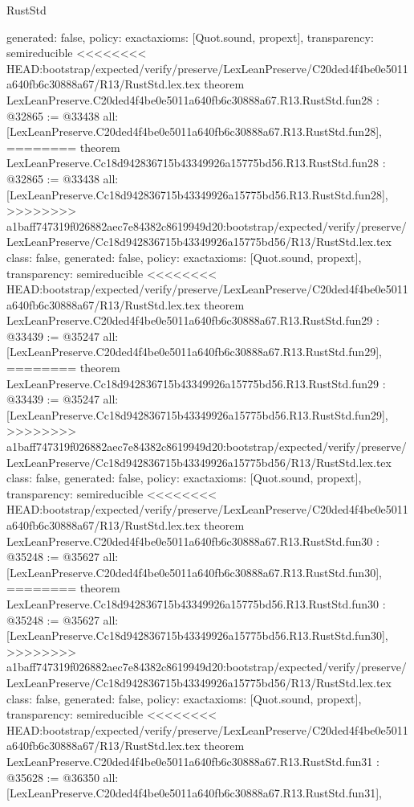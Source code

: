 \begin{lexlean}{RustStd}
\begin{coremodule}
{\begin{coremodule}
{{{{{{{{{{{{{{{{{{{{{{{{{{{{{{{  generated: false,
  policy: exact{axioms: [Quot.sound, propext]},
  transparency: semireducible
}
<<<<<<<< HEAD:bootstrap/expected/verify/preserve/LexLeanPreserve/C20ded4f4be0e5011a640fb6c30888a67/R13/RustStd.lex.tex
theorem LexLeanPreserve.C20ded4f4be0e5011a640fb6c30888a67.R13.RustStd.fun28 : @32865 := @33438 {
  all: [LexLeanPreserve.C20ded4f4be0e5011a640fb6c30888a67.R13.RustStd.fun28],
========
theorem LexLeanPreserve.Cc18d942836715b43349926a15775bd56.R13.RustStd.fun28 : @32865 := @33438 {
  all: [LexLeanPreserve.Cc18d942836715b43349926a15775bd56.R13.RustStd.fun28],
>>>>>>>> a1baff747319f026882aec7e84382c8619949d20:bootstrap/expected/verify/preserve/LexLeanPreserve/Cc18d942836715b43349926a15775bd56/R13/RustStd.lex.tex
  class: false,
  generated: false,
  policy: exact{axioms: [Quot.sound, propext]},
  transparency: semireducible
}
<<<<<<<< HEAD:bootstrap/expected/verify/preserve/LexLeanPreserve/C20ded4f4be0e5011a640fb6c30888a67/R13/RustStd.lex.tex
theorem LexLeanPreserve.C20ded4f4be0e5011a640fb6c30888a67.R13.RustStd.fun29 : @33439 := @35247 {
  all: [LexLeanPreserve.C20ded4f4be0e5011a640fb6c30888a67.R13.RustStd.fun29],
========
theorem LexLeanPreserve.Cc18d942836715b43349926a15775bd56.R13.RustStd.fun29 : @33439 := @35247 {
  all: [LexLeanPreserve.Cc18d942836715b43349926a15775bd56.R13.RustStd.fun29],
>>>>>>>> a1baff747319f026882aec7e84382c8619949d20:bootstrap/expected/verify/preserve/LexLeanPreserve/Cc18d942836715b43349926a15775bd56/R13/RustStd.lex.tex
  class: false,
  generated: false,
  policy: exact{axioms: [Quot.sound, propext]},
  transparency: semireducible
}
<<<<<<<< HEAD:bootstrap/expected/verify/preserve/LexLeanPreserve/C20ded4f4be0e5011a640fb6c30888a67/R13/RustStd.lex.tex
theorem LexLeanPreserve.C20ded4f4be0e5011a640fb6c30888a67.R13.RustStd.fun30 : @35248 := @35627 {
  all: [LexLeanPreserve.C20ded4f4be0e5011a640fb6c30888a67.R13.RustStd.fun30],
========
theorem LexLeanPreserve.Cc18d942836715b43349926a15775bd56.R13.RustStd.fun30 : @35248 := @35627 {
  all: [LexLeanPreserve.Cc18d942836715b43349926a15775bd56.R13.RustStd.fun30],
>>>>>>>> a1baff747319f026882aec7e84382c8619949d20:bootstrap/expected/verify/preserve/LexLeanPreserve/Cc18d942836715b43349926a15775bd56/R13/RustStd.lex.tex
  class: false,
  generated: false,
  policy: exact{axioms: [Quot.sound, propext]},
  transparency: semireducible
}
<<<<<<<< HEAD:bootstrap/expected/verify/preserve/LexLeanPreserve/C20ded4f4be0e5011a640fb6c30888a67/R13/RustStd.lex.tex
theorem LexLeanPreserve.C20ded4f4be0e5011a640fb6c30888a67.R13.RustStd.fun31 : @35628 := @36350 {
  all: [LexLeanPreserve.C20ded4f4be0e5011a640fb6c30888a67.R13.RustStd.fun31],
}}}}}}}}}}}}}}}}}}}}}}}}}}}}}}}}}}
\end{coremodule}}
\end{coremodule}
\end{lexlean}
